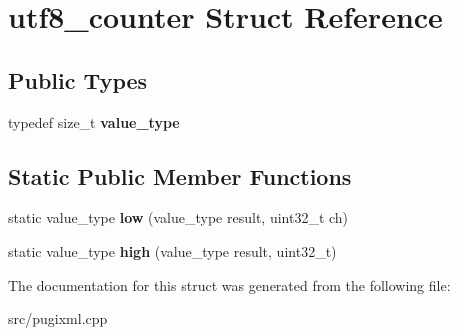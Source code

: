 \hypertarget{structutf8__counter}{}\section{utf8\+\_\+counter Struct Reference}
\label{structutf8__counter}
\subsection*{Public Types}
\begin{DoxyCompactItemize}
\item 
\mbox{\label{structutf8__counter_adb65152c007965c42184614da9c4af1b}} 
typedef size\+\_\+t {\bfseries value\+\_\+type}
\end{DoxyCompactItemize}
\subsection*{Static Public Member Functions}
\begin{DoxyCompactItemize}
\item 
\mbox{\label{structutf8__counter_a0950643189089175ae0eac9b4193534d}} 
static value\+\_\+type {\bfseries low} (value\+\_\+type result, uint32\+\_\+t ch)
\item 
\mbox{\label{structutf8__counter_ab16e675980a15e1ede2e4cd18d19f7b1}} 
static value\+\_\+type {\bfseries high} (value\+\_\+type result, uint32\+\_\+t)
\end{DoxyCompactItemize}


The documentation for this struct was generated from the following file\+:\begin{DoxyCompactItemize}
\item 
src/pugixml.\+cpp\end{DoxyCompactItemize}
